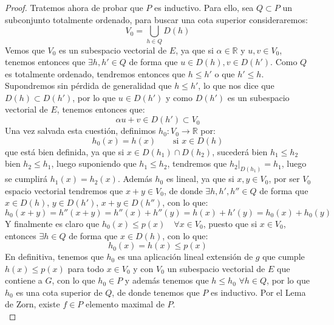 \begin{teo}
\begin{proof}
        \noindent
        Tratemos ahora de probar que $P$ es inductivo. Para ello, sea $Q\subset P$ un subconjunto totalmente ordenado, para buscar una cota superior consideraremos:
        \begin{equation*}
            V_0 = \bigcup_{h\in Q}D(h)
        \end{equation*}
        Vemos que $V_0$ es un subespacio vectorial de $E$, ya que si $\alpha\in \mathbb{R}$ y $u,v\in V_0$, tenemos entonces que $\exists h,h'\in Q$ de forma que $u\in D(h), v\in D(h')$. Como $Q$ es totalmente ordenado, tendremos entonces que $h\leq h'$ o que $h'\leq h$. Supondremos sin pérdida de generalidad que $h\leq h'$, lo que nos dice que $D(h)\subset D(h')$, por lo que $u\in D(h')$ y como $D(h')$ es un subespacio vectorial de $E$, tenemos entonces que:
        \begin{equation*}
            \alpha u + v \in D(h') \subset V_0
        \end{equation*}
        Una vez salvada esta cuestión, definimos $h_0:V_0\to \mathbb{R}$ por:
        \begin{equation*}
            h_0(x) = h(x) \qquad \text{si\ } x\in D(h)
        \end{equation*}
        que está bien definida, ya que si $x\in D(h_1)\cap D(h_2)$, sucederá bien $h_1 \leq h_2$ bien $h_2 \leq h_1$, luego suponiendo que $h_1\leq h_2$, tendremos que $h_2\big|_{D(h_1)} = h_1$, luego se cumplirá $h_1(x) = h_2(x)$. Además $h_0$ es lineal, ya que si $x,y\in V_0$, por ser $V_0$ espacio vectorial tendremos que $x+y\in V_0$, de donde $\exists h,h',h'' \in Q$ de forma que $x\in D(h)$, $y\in D(h')$, $x+y\in D(h'')$, con lo que:
        \begin{equation*}
            h_0(x+y) = h''(x+y) = h''(x) + h''(y) = h(x) + h'(y) = h_0(x) + h_0(y)
        \end{equation*}
        Y finalmente es claro que $h_0(x) \leq p(x)\quad \forall x\in V_0$, puesto que si $x\in V_0$, entonces $\exists h\in Q$ de forma que $x\in D(h)$, con lo que:
        \begin{equation*}
            h_0(x) = h(x) \leq p(x)
        \end{equation*}
        En definitiva, tenemos que $h_0$ es una aplicación lineal extensión de $g$ que cumple $h(x) \leq p(x)$ para todo $x\in V_0$ y con $V_0$ un subespacio vectorial de $E$ que contiene a $G$, con lo que $h_0\in P$ y además tenemos que $h\leq h_0$ $\forall h\in Q$, por lo que $h_0$ es una cota superior de $Q$, de donde tenemos que $P$ es inductivo. Por el Lema de Zorn, existe $f\in P$ elemento maximal de $P$.\\


\end{proof}
\end{teo}
